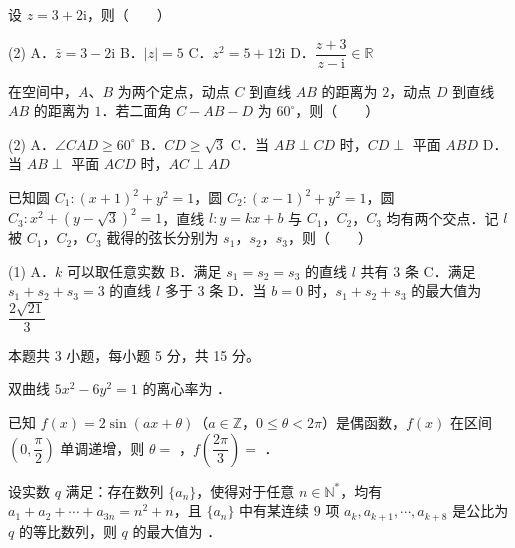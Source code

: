 \begin{question}
设 $z=3+2\mathrm{i}$，则\mbox{（　　）}

\begin{gkopts}(2)
\task A．$\bar{z}=3-2\mathrm{i}$
\task B．$|z|=5$
\task C．$z^2=5+12\mathrm{i}$
\task D．$\dfrac{z+3}{z-\mathrm{i}}\in\mathbb{R}$
\end{gkopts}

\end{question}
\begin{question}
在空间中，$A$、$B$ 为两个定点，动点 $C$ 到直线 $AB$ 的距离为 $2$，动点 $D$ 到直线 $AB$ 的距离为 $1$．若二面角 $C-AB-D$ 为 $60^\circ$，则\mbox{（　　）}

\begin{gkopts}(2)
\task A．$\angle CAD\ge 60^\circ$
\task B．$CD\ge\sqrt{3}$
\task C．当 $AB\perp CD$ 时，$CD\perp$ 平面 $ABD$
\task D．当 $AB\perp$ 平面 $ACD$ 时，$AC\perp AD$
\end{gkopts}

\end{question}
\begin{question}
已知圆 $C_1:(x+1)^2+y^2=1$，圆 $C_2:(x-1)^2+y^2=1$，圆 $C_3:x^2+(y-\sqrt{3})^2=1$，直线 $l:y=kx+b$ 与 $C_1$，$C_2$，$C_3$ 均有两个交点．记 $l$ 被 $C_1$，$C_2$，$C_3$ 截得的弦长分别为 $s_1$，$s_2$，$s_3$，则\mbox{（　　）}

\begin{gkopts}(1)
\task A．$k$ 可以取任意实数
\task B．满足 $s_1=s_2=s_3$ 的直线 $l$ 共有 $3$ 条
\task C．满足 $s_1+s_2+s_3=3$ 的直线 $l$ 多于 $3$ 条
\task D．当 $b=0$ 时，$s_1+s_2+s_3$ 的最大值为 $\dfrac{2\sqrt{21}}{3}$
\end{gkopts}

\par\medskip

\end{question}

\begin{gktip}
本题共 3 小题，每小题 5 分，共 15 分。
\end{gktip}

\begin{question}
双曲线 $5x^2-6y^2=1$ 的离心率为 \gkblank{}．

\end{question}
\begin{question}
已知 $f(x)=2\sin(ax+\theta)$（$a\in\mathbb{Z}$，$0\le\theta<2\pi$）是偶函数，$f(x)$ 在区间 $\left(0,\dfrac{\pi}{2}\right)$ 单调递增，则 $\theta=$ \gkblank{}，$f\left(\dfrac{2\pi}{3}\right)=$ \gkblank{}．

\end{question}
\begin{question}
设实数 $q$ 满足：存在数列 $\{a_n\}$，使得对于任意 $n\in\mathbb{N}^*$，均有 $a_1+a_2+\cdots+a_{3n}=n^2+n$，且 $\{a_n\}$ 中有某连续 $9$ 项 $a_k,a_{k+1},\cdots,a_{k+8}$ 是公比为 $q$ 的等比数列，则 $q$ 的最大值为 \gkblank{}．

\par\medskip

\end{question}

